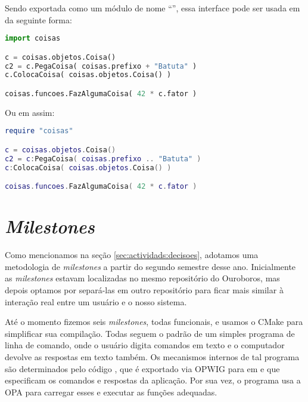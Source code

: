 Sendo exportada como um módulo de nome ``'', essa interface pode
ser usada em  da seguinte forma:

\vspace{1em}
\begin{lstlisting}[language=python]
import coisas

c = coisas.objetos.Coisa()
c2 = c.PegaCoisa( coisas.prefixo + "Batuta" )
c.ColocaCoisa( coisas.objetos.Coisa() )

coisas.funcoes.FazAlgumaCoisa( 42 * c.fator )
\end{lstlisting}
\vspace{1em}

Ou em  assim:

\vspace{1em}
\begin{lstlisting}[language=lua]
require "coisas"

c = coisas.objetos.Coisa()
c2 = c:PegaCoisa( coisas.prefixo .. "Batuta" )
c:ColocaCoisa( coisas.objetos.Coisa() )

coisas.funcoes.FazAlgumaCoisa( 42 * c.fator )
\end{lstlisting}
\vspace{1em}


\section{\textit{Milestones}}
\label{cap:resultados:milestones}

Como mencionamos na seção \ref{sec:actividads:decisoes}, adotamos uma metodologia de
\textit{milestones} a partir do segundo semestre desse ano.
Inicialmente as \textit{milestones} estavam localizadas no mesmo repositório do 
Ouroboros, mas depois optamos por separá-las em outro repositório para ficar mais
similar à interação real entre um usuário e o nosso sistema\footnotemark{}. 


Até o momento fizemos seis \textit{milestones}, todas funcionais, e usamos o CMake 
para simplificar sua compilação. Todas seguem o padrão de um simples programa de 
linha de comando, onde o usuário digita comandos em texto e o computador devolve
as respostas em texto também. Os mecanismos internos de tal programa são determinados
pelo código \CXX{}, que é exportado via OPWIG para  em  e
 que especificam os comandos e respostas da aplicação. Por sua vez, o
programa usa a OPA para carregar esses  e executar as funções adequadas.

